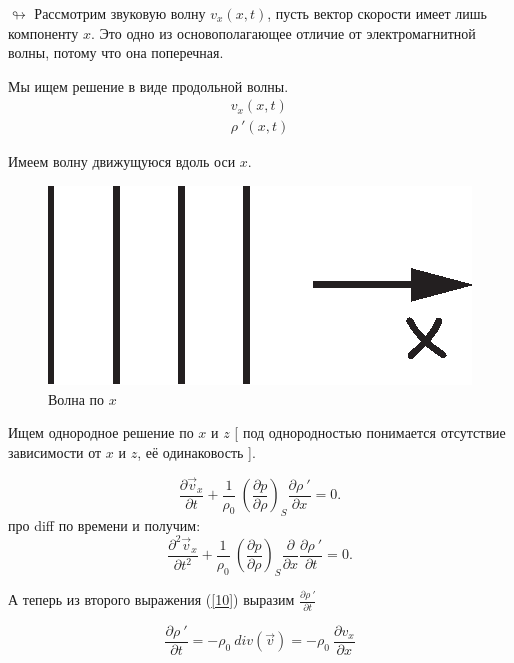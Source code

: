 \documentclass[14pt,a4paper,oneside]{extarticle}	%
\begin{document}
$ \looparrowright $
Рассмотрим звуковую волну $ v_{x}(x,t) $, пусть вектор скорости имеет лишь компоненту $ x $.
Это одно из основополагающее отличие от электромагнитной волны, потому что она поперечная.

Мы ищем решение в виде продольной волны.
\begin{eqnarray*}
v_{x} (x,t) \\
\rho\:'(x,t)
\end{eqnarray*}

Имеем волну движущуюся вдоль оси $ x $.

\begin{figure}[h!] 	%
	\centering 		%
	\includegraphics{1.eps} %
	\caption{Волна по $ x $}
	\label{fig::1}
\end{figure}

Ищем однородное решение по $ x $ и $ z $
[ под однородностью понимается отсутствие зависимости от $ x $ и $ z $, её одинаковость ].

\begin{equation*}
\frac{\partial \vec{v}_{x}}{\partial t} + \frac{1}{\rho_{0}}\:\left( \frac{\partial p}{\partial \rho} \right)_{S} \frac{\partial\rho\:'}{\partial x} = 0.
\end{equation*}
про diff по времени и получим:
\begin{equation}\label{12}
\frac{\partial^{2} \vec{v}_{x}}{\partial t^{2}} + \frac{1}{\rho_{0}}\:\left( \frac{\partial p}{\partial \rho} \right)_{S} \frac{\partial}{\partial x}\frac{\partial\rho\:'}{\partial t} = 0.
\end{equation}

А теперь из второго выражения (\ref{10}) выразим $ \frac{\partial \rho \: '}{\partial t} $

\begin{equation}\label{13}
\frac{\partial \rho\:'}{\partial t} = - \rho_{0}\: div(\vec{v}) = - \rho_{0}\: \frac{\partial v_{x}}{\partial x}
\end{equation}
\end{document}
